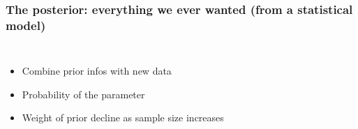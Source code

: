 \documentclass{beamer}
\begin{document}
  \begin{frame}
  \frametitle{\bf The posterior: everything we ever wanted (from a statistical model)}
  
  \begin{columns}
    \begin{itemize}
     \item Combine prior infos with new data
     \item Probability of the parameter 
     \item Weight of prior decline as sample size increases
    \end{itemize}
    

\end{columns}
\end{frame}
\end{document}
